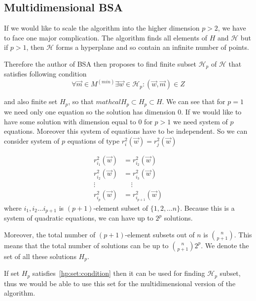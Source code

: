 \subsection{Multidimensional BSA}

If we would like to scale the algorithm into the higher dimension $p > 2$, we have to face one major complication. The algorithm finds all elements of $H$ and $\mathcal{H}$ but if $p > 1$, then  $\mathcal{H}$ forms a hyperplane and so contain an infinite number of points.

Therefore the author of BSA then proposes to find finite subset $\mathcal{H}_p$ of $\mathcal{H}$ that satisfies following condition
\begin{equation} \label{hp:set:condition}
    \forall \vec{m} \in M^{(min)} \exists \vec{w} \in \mathcal{H}_p : (\vec{w},\vec{m}) \in Z
\end{equation}

and also finite set $H_p$, so that $mathcal{H}_p \subset H_p \subset H$. We can see that for $p=1$ we need only one equation so the solution has dimension $0$. If we would like to have some solution with dimension equal to $0$ for $p > 1$ we need system of $p$ equations. Moreover this system of equations have to be independent. So we can consider system of $p$ equations of type $ r^{2}_i(\vec{w}) = r^{2}_j(\vec{w})$

\begin{align} 
    r^{2}_{i_1}(\vec{w}) &= r^{2}_{i_2}(\vec{w}) \label{p:plus:one:equations}   \\
    r^{2}_{i_2}(\vec{w}) &= r^{2}_{i_3}(\vec{w}) \nonumber  \\
    \vdots \ \ \  & \ \ \ \  \ \vdots  \nonumber \\ 
    r^{2}_{i_p}(\vec{w}) &=  r^{2}_{i_{p+1}}(\vec{w}) \nonumber 
\end{align}
where $i_1, i_2 \ldots i_{p+1}$  is $(p+1)$-element subset of $\{{1, 2, \ldots n \}}$.
Because this is a system of quadratic equations, we can have up to $2^p$ solutions.

Moreover, the total number of $(p+1)$-element subsets out of $n$ is $\binom{n}{p+1}$.
This means that the total number of solutions can be up to $\binom{n}{p+1} 2^p$. 
We denote the set of all these solutions $H_p$.

If set $H_p$ satisfies~\eqref{hp:set:condition} then it can be used for finding $\mathcal{H}_p$ subset, thus we would be able to use this set for the multidimensional version of the algorithm.

